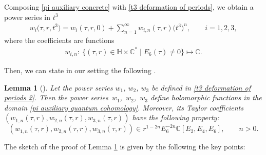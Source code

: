 \documentclass[pdftex]{sigma}
\numberwithin{equation}{section}
\newtheorem{Lemma}[Theorem]{Lemma}
\begin{document}
Composing \eqref{pi auxiliary concrete} with \eqref{t3 deformation of periods}, we obtain a power series in \(t^3\)
\begin{gather}\label{t3 deformation of periods 2}
w_{i}\bigl(\tau,r,t^3\bigr) = w_i(\tau,r,0) + \sum_{n=1}^{\infty} w_{i,n}(\tau,r) \bigl( t^3 \bigr)^n, \qquad i=1,2,3,
\end{gather}
where the coefficients are functions
\begin{gather*}
w_{i,n}\colon\ \{(\tau,r) \in \mathbb{H} \times \mathbb{C}^{*} \mid E_6(\tau) \neq 0\} \mapsto \mathbb{C}.
\end{gather*}

Then, we can state in our setting the following \cite[Proposition 5.8]{Milanov}.

\begin{Lemma}[{\cite{Milanov}}]\label{lemma Milanov deformation 1}
Let the power series $w_1$, $w_2$, $w_3$ be defined in \eqref{t3 deformation of periods 2}. Then the power series~$w_1$,~$w_2$,~$w_3$ define holomorphic functions in the domain \eqref{pi auxiliary quantum cohomology}.
 Moreover, its Taylor coefficients $(w_{1,n}(\tau,r),w_{2,n}(\tau,r),w_{3,n}(\tau,r))$ have the following property:
\[%
(w_{1,n}(\tau,r),w_{2,n}(\tau,r),w_{3,n}(\tau,r)) \in r^{1-2n}E_6^{-2n}\mathbb{C}[ E_2,E_4,E_6], \qquad n>0 .
\]
\end{Lemma}
The sketch of the proof of Lemma \ref{lemma Milanov deformation 1} is given by the following the key points:
\end{document}
